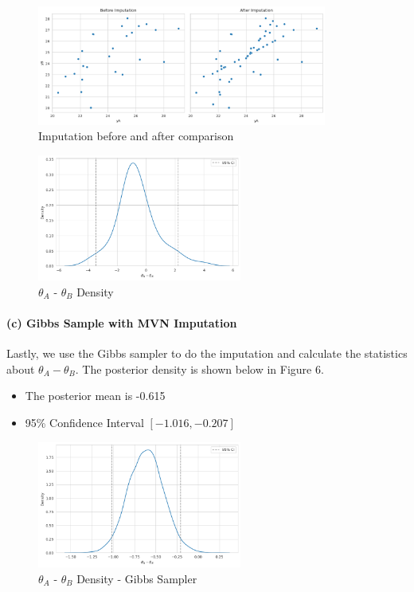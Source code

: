 \documentclass[11pt, letterpaper]{article}
\begin{document}
\begin{figure}[!h]
  \centering
  \includegraphics[width=0.85\textwidth]{2.a.png}
  \captionsetup{justification=centering}
  \caption{Imputation before and after comparison}
\end{figure}
\begin{figure}[!h]
  \centering
  \includegraphics[width=0.6\textwidth]{2.b.png}
  \captionsetup{justification=centering}
  \caption{$\theta_A$ - $\theta_B$ Density}
\end{figure}

\paragraph{(c) Gibbs Sample with MVN Imputation}
Lastly, we use the Gibbs sampler to do the imputation and calculate the statistics about $\theta_A - \theta_B$. The posterior density is shown below in Figure 6.
\begin{itemize}
    \item The posterior mean is -0.615 
    \item 95\% Confidence Interval $[-1.016, -0.207]$
\end{itemize}
\begin{figure}[!h]
  \centering
  \includegraphics[width=0.6\textwidth]{2.c.png}
  \captionsetup{justification=centering}
  \caption{$\theta_A$ - $\theta_B$ Density - Gibbs Sampler}
\end{figure}
\end{document}
